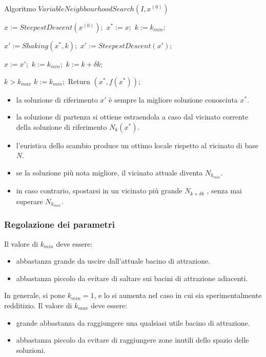 \documentclass{article}
\begin{document}
\begin{algorithm}[H]
    \caption{Algoritmo $VariableNeighbourhoodSearch(I,x^{(0)})$}
    \label{alg:ils1}
    \begin{algorithmic}
        \State $x:=SteepestDescent(x^{(0)});$
        \State $x^*:=x;$
        \State $k:=k_{min};$

            \State $x':=Shaking(x^*,k);$
            \State $x':=SteepestDescent(x');$

                \State $x:=x';$
                \State $k:=k_{min};$
            \Else
                \State $k:=k+\delta k;$
            \EndIf

            \If $k>k_{max}$
                \State $k:=k_{min};$
            \EndIf
        \EndFor
        \State Return $(x^*,f(x^*));$

    \end{algorithmic}
\end{algorithm}
\begin{itemize}
    \item la soluzione di riferimento $x'$ è sempre la migliore soluzione conosciuta $x^*$.
    \item la soluzione di partenza si ottiene estraendola a caso dal vicinato corrente della
    soluzione di riferimento $N_k(x^*)$.
    \item l'euristica dello scambio produce un ottimo locale rispetto al vicinato di
    base $N$.
    \item se la soluzione più nota migliore, il vicinato attuale diventa $N_{k_{min}}$.
    \item in caso contrario, spostarsi in un vicinato più grande $N_{k+\delta k}$ ,
    senza mai superare $N_{k_{max}}$.
\end{itemize}

\subsubsection{Regolazione dei parametri}
Il valore di $k_{min}$ deve essere:
\begin{itemize}
    \item abbastanza grande da uscire dall'attuale bacino di attrazione.
    \item abbastanza piccolo da evitare di saltare sui bacini di attrazione adiacenti.
\end{itemize}

In generale, si pone $k_{min}=1$, e lo si aumenta nel caso in cui sia sperimentalmente
redditizio. Il valore di $k_{max}$ deve essere:
\begin{itemize}
    \item grande abbastanza da raggiungere una qualsiasi utile bacino di attrazione.
    \item abbastanza piccolo da evitare di raggiungere zone inutili dello spazio delle soluzioni.
\end{itemize}
\end{document}
